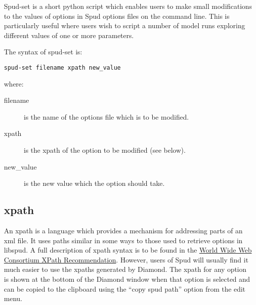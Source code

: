 \documentclass[a4paper, 11pt]{book}
\begin{document}
Spud-set is a short python script which enables users to make small
modifications to the values of options in Spud options files on the command
line. This is particularly useful where users wish to script a number of
model runs exploring different values of one or more parameters.

The syntax of spud-set is:
\begin{verbatim}
spud-set filename xpath new_value
\end{verbatim}
where:
\begin{description}
\item[filename] is the name of the options file which is to be modified.
\item[xpath] is the xpath of the option to be modified (see below).
\item[new\_value] is the new value which the option should take.
\end{description}

\subsection{xpath}

An xpath is a language which provides a mechanism for addressing parts of an
xml file. It uses paths similar in some ways to those used to retrieve
options in libspud. A full description of xpath syntax is to be found in the
\href{http://www.w3.org/TR/xpath}{World Wide Web Consortium XPath
  Recommendation}. However, users of Spud will usually find it much easier
to use the xpaths generated by Diamond. The xpath for any option is shown at
the bottom of the Diamond window when that option is selected and can be
copied to the clipboard using the ``copy spud path'' option from the edit menu.
\end{document}
